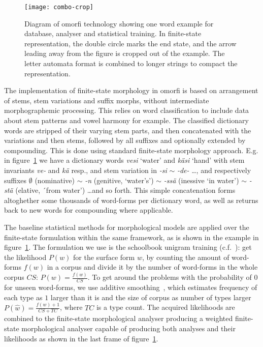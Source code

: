 \documentclass[a4paper,12pt]{article}
\begin{document}
\begin{figure}[tb!]
    \texttt{[image: combo-crop]}
    \caption{Diagram of omorfi technology showing one word example for
        database, analyser and statistical training. In finite-state
        representation, the double circle marks the end state, and the arrow
        leading away from the figure is cropped out of the example. The
        letter automata format is combined to longer strings to compact
        the representation.
    \label{fig:combo}}
\end{figure}

The implementation of finite-state morphology in omorfi is based on
arrangement of stems, stem variations and suffix morphs, without
intermediate morphographemic processing. This relies on word classification
to include data about stem patterns and vowel harmony for example. The
classified dictionary words are stripped of their varying stem parts, and
then concatenated with the variations and then stems, followed by all
suffixes and optionally extended by compounding. This is done using standard
finite-state morphology approach. E.g.  in figure~\ref{fig:combo} we have a
dictionary words \textit{vesi} `water' and \textit{käsi} `hand' with stem
invariants \textit{ve-} and \textit{kä} resp., and stem variation in
\textit{-si} $\sim$ \textit{-de-} \ldots, and respectively suffixes
$\emptyset$ (nominative) $\sim$ \textit{-n} (genitive, `water's') $\sim$
\textit{-ssä} (inessive `in water')  $\sim$ \textit{-stä} (elative, ´from
water') \ldots and so forth. This simple concatenation forms altoghether
some thousands of word-forms per dictionary word, as well as returns back to
new words for compounding where applicable.

The baseline statistical methods for morphological models are applied over
the finite-state formulation within the same framework, as is shown in the
example in figure~\ref{fig:combo}.  The formulation we use is the schoolbook
unigram training (c.f.~\cite{manning}): get the likelihood $P(w)$ for the
surface form $w$, by counting the amount of word-forms $f(w)$ in a corpus
and divide it by the number of word-forms in the whole corpus $CS$: $P(w) =
\frac{f(w)}{CS}$.  To get around the problems with the probability of $0$
for unseen word-forms, we use additive smoothing~\citep{chen1999empirical},
which estimates frequency of each type as $1$ larger than it is and the size
of corpus as number of types larger $P(\hat w) = \frac{f(w) + 1}{CS + TC}$,
where $TC$ is a type count. The acquired likelihoods are combined to the
finite-state morphological analyser producing a weighted finite-state
morphological analyser capable of producing both analyses and their
likelihoods as shown in the last frame of figure~\ref{fig:combo}.
\end{document}
